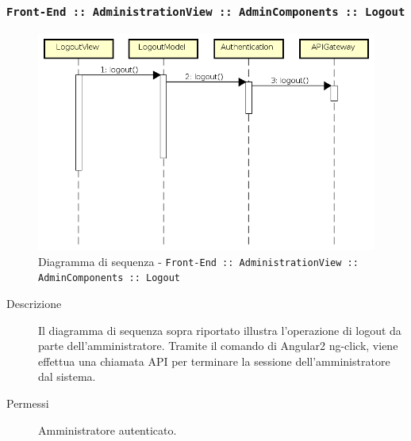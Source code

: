 \documentclass[../DefinizioneDiProdotto.tex]{subfiles}
\begin{document}
		\newpage
		\subsubsection{\texttt{Front-End :: AdministrationView :: AdminComponents :: Logout}}
		\begin{figure}[!h]
			\centering
			\includegraphics[width=\textwidth]{DiagrammiSequenza/Front-End/AdministrationView/Logout.png}
			\caption{Diagramma di sequenza - \texttt{Front-End :: AdministrationView :: AdminComponents :: Logout }}
		\end{figure}
		\begin{description}
			\item [Descrizione] Il diagramma di sequenza sopra riportato illustra l'operazione di logout da parte dell'amministratore. Tramite il comando di Angular2 ng-click, viene effettua una chiamata API per terminare la sessione dell'amministratore dal sistema.
			\item [Permessi] Amministratore autenticato.
		\end{description}
\end{document}
